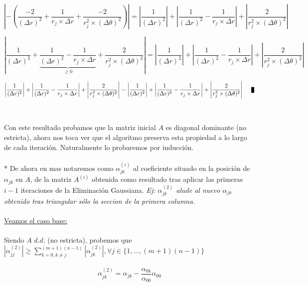 \begin{equation}
 \left | -\left ( \frac{-2}{(\Delta r)^2} + \frac{1}{r_j \times \Delta r} + \frac{-2}{r_j^2 \times (\Delta \theta)^2} \right ) \right | = \left | \frac{1}{(\Delta r)^2} \right | + \left | \frac{1}{(\Delta r)^2} - \frac{1}{r_j \times \Delta r} \right | + \left | \frac{2}{r_j^2 \times (\Delta \theta)^2} \right | 
\end{equation}

\begin{equation}
 \left | \frac{1}{(\Delta r)^2} + \underbrace{\frac{1}{(\Delta r)^2} - \frac{1}{r_j \times \Delta r}}_{ \geq 0} + \frac{2}{r_j^2 \times (\Delta \theta)^2} \right | = \left | \frac{1}{(\Delta r)^2} \right | + \left | \frac{1}{(\Delta r)^2} - \frac{1}{r_j \times \Delta r} \right | +  \left | \frac{2}{r_j^2 \times (\Delta \theta)^2} \right |
\end{equation}

\begin{equation}
 \left | \frac{1}{(\Delta r)^2} \right | + \left | \frac{1}{(\Delta r)^2} - \frac{1}{r_j \times \Delta r} \right | + \left | \frac{2}{r_j^2 \times (\Delta \theta)^2} \right | = \left | \frac{1}{(\Delta r)^2} \right | + \left | \frac{1}{(\Delta r)^2} - \frac{1}{r_j \times \Delta r} \right | +  \left | \frac{2}{r_j^2 \times (\Delta \theta)^2} \right | \qed
\end{equation}
\\
\\
Con este resultado probamos que la matriz inicial $A$ es diagonal dominante (no estricta), ahora nos toca ver que el algoritmo preserva esta propiedad a lo largo de cada iteraci\'on. Naturalmente lo probaremos por inducci\'on.
\\
\\
* De ahora en mas notaremos como $\alpha_{jk}^{(i)}$ al coeficiente situado en la posición de $\alpha_{jk}$ en  $A$, de la matriz $A^{(i)}$ obtenida como resultado tras aplicar las primeras $i-1$ iteraciones de la Eliminaci\'on Gaussiana. \textit{Ej: $\alpha_{jk}^{(2)}$ alude al nuevo $\alpha_{jk}$ obtenido tras triangular s\'olo la seccion de la primera columna.}
\\  
\\
\underline{Veamos el caso base:}
\\
\\
Siendo $A$ $d.d.$ (no estricta), probemos que $\left | \alpha_{jj}^{(2)} \right | \geq \sum_{k=0,k \neq j}^{(m+1)(n-1)} \left | \alpha_{jk}^{(2)} \right |, \forall j \in \{1,...,(m+1)(n-1)\}$
\\
\\
\begin{equation}
\alpha_{jk}^{(2)} =  \alpha_{jk} - \frac{\alpha_{0k}}{\alpha_{00}}\alpha_{00}
\end{equation}

